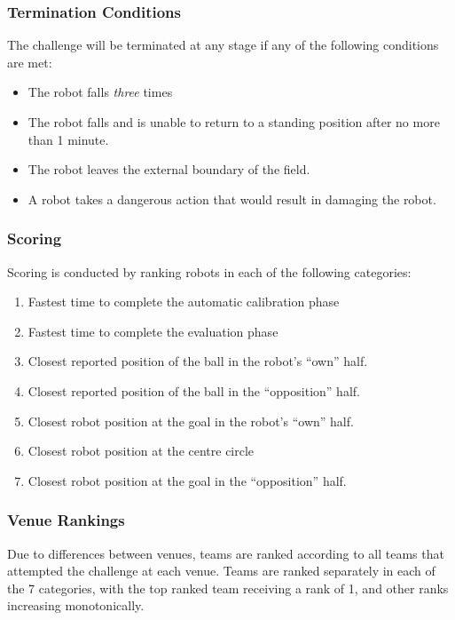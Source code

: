 \subsubsection{Termination Conditions}

The challenge will be terminated at any stage if any of the following conditions are met:
\begin{itemize}
    \item The robot falls \textit{three} times
    \item The robot falls and is unable to return to a standing position after no more than 1 minute.
    \item The robot leaves the external boundary of the field.
    \item A robot takes a dangerous action that would result in damaging the robot. %
\end{itemize}

\subsubsection{Scoring}

Scoring is conducted by ranking robots in each of the following categories:
\begin{enumerate}
    \item Fastest time to complete the automatic calibration phase
    \item Fastest time to complete the evaluation phase
    \item Closest reported position of the ball in the robot's ``own'' half.
    \item Closest reported position of the ball in the ``opposition'' half.
    \item Closest robot position at the goal in the robot's ``own'' half.
    \item Closest robot position at the centre circle
    \item Closest robot position at the goal in the ``opposition'' half.
\end{enumerate} 

\subsubsection{Venue Rankings}
Due to differences between venues, teams are ranked according to all teams that attempted the challenge at each venue. Teams are ranked separately in each of the 7 categories, with the top ranked team receiving a rank of 1, and other ranks increasing monotonically.


